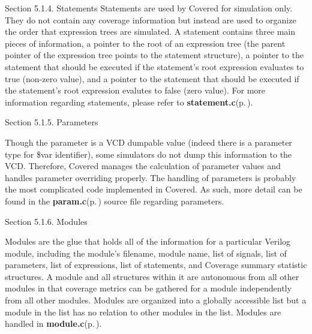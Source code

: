 \begin{Desc}
\item[Section 5.1.4. Statements]Statements are used by Covered for simulation only. They do not contain any coverage information but instead are used to organize the order that expression trees are simulated. A statement contains three main pieces of information, a pointer to the root of an expression tree (the parent pointer of the expression tree points to the statement structure), a pointer to the statement that should be executed if the statement's root expression evaluates to true (non-zero value), and a pointer to the statement that should be executed if the statement's root expression evalutes to false (zero value). For more information regarding statements, please refer to {\bf statement.c}{\rm (p.\,\pageref{statement_8c})}.\end{Desc}
\begin{Desc}
\item[Section 5.1.5. Parameters]\end{Desc}
\begin{Desc}
\item[]Though the parameter is a VCD dumpable value (indeed there is a parameter type for \$var identifier), some simulators do not dump this information to the VCD. Therefore, Covered manages the calculation of parameter values and handles parameter overriding properly. The handling of parameters is probably the most complicated code implemented in Covered. As such, more detail can be found in the {\bf param.c}{\rm (p.\,\pageref{param_8c})} source file regarding parameters.\end{Desc}
\begin{Desc}
\item[Section 5.1.6. Modules]\end{Desc}
\begin{Desc}
\item[]Modules are the glue that holds all of the information for a particular Verilog module, including the module's filename, module name, list of signals, list of parameters, list of expressions, list of statements, and Coverage summary statistic structures. A module and all structures within it are autonomous from all other modules in that coverage metrics can be gathered for a module independently from all other modules. Modules are organized into a globally accessible list but a module in the list has no relation to other modules in the list. Modules are handled in {\bf module.c}{\rm (p.\,\pageref{module_8c})}.\end{Desc}

